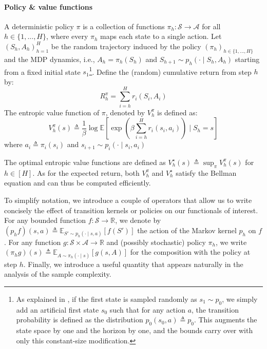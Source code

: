 \documentclass[final,12pt]{colt2026} %
\begin{document}
\paragraph{Policy \& value functions} A deterministic policy $\pi$ is a collection of functions $\pi_h : \mathcal S \to \mathcal A$
for all $h \in \{1,...,H\}$, where every $\pi_h$ maps each state to a single action.
Let $(S_h,A_h)_{h=1}^H$ be the random trajectory induced by the policy $(\pi_h)_{h \in \{1,...,H\}}$ and the MDP dynamics,
i.e., $A_h = \pi_h(S_h)$ and $S_{h+1}\sim p_h(\cdot\mid S_h,A_h)$ starting from a fixed initial state $s_1$\footnote{As explained in \citep{Fiechter1994}, if the first state is sampled randomly as $s_1 \sim p_0$, we simply add an artificial first state $s_0$ such that for any action $a$, the transition probability is defined as the distribution $p_0(s_0, a) \triangleq p_0$. This augments the state space by one and the horizon by one, and the bounds carry over with only this constant-size modification.}. Define the (random) cumulative return from step $h$ by:
$$
R_h^\pi = \sum_{i=h}^H r_i(S_i,A_i)
$$
The entropic value function of $\pi$, denoted by $V_h^\pi$ is defined as:
$$
V_h^\pi(s)
\triangleq
\frac{1}{\beta}
\log \mathbb E\left[
\exp\left(
\beta \sum_{i = h}^H r_{i}(s_{i}, a_{i})
\right)
\mid S_h = s
\right]
$$
where $a_{i} \triangleq \pi_{i}(s_{i})$ and
$s_{i+1} \sim p_{i}(\cdot \mid s_{i}, a_{i})$

The optimal entropic value functions are defined as
$
V_h^\star(s) \triangleq \sup_{\pi} V_h^\pi(s)$ for $h \in [H]$. 
As for the expected return, both $V_h^\pi$ and $V_h^\star$ satisfy the Bellman equation \citep{borkar2001,sutton2018reinforcement,marthe2023beyond} and can thus be computed efficiently.

To simplify notation, we introduce a couple of operators that allow us to write concisely the effect of transition kernels or policies on our functionals of interest. 
For any bounded function $f : \mathcal S \to \mathbb R$, we denote by
$
(p_h f)(s,a) \triangleq \mathbb E_{S' \sim p_h(\cdot \mid s,a)}[f(S')]
$ the action of the Markov kernel $p_h$ on $f$. For any function $g : \mathcal S \times \mathcal A \to \mathbb R$ and (possibly stochastic) policy $\pi_h$, we write
$(\pi_h g)(s) \triangleq \mathbb E_{A \sim \pi_h(\cdot \mid s)}[g(s,A)]$ for the composition with the policy at step $h$.
Finally, we introduce a useful quantity that appears naturally in the analysis of the sample complexity.
\end{document}
